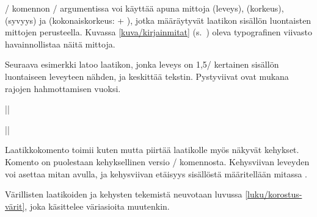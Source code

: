 \begin{koodilohkosis}
\end{koodilohkosis}

\begin{tulossis}
\end{tulossis}

\noindent
{}\-/ komennon \-/ argumentissa voi käyttää
apuna mittoja  (leveys),  (korkeus),
 (syvyys) ja  (kokonaiskorkeus:
 + ), jotka määräytyvät laatikon sisällön
luontaisten mittojen perusteella. Kuvassa \ref{kuva/kirjainmitat}
(s.~\pageref{kuva/kirjainmitat}) oleva typografinen viivasto
havainnollistaa näitä mittoja.

Seuraava esimerkki latoo laatikon, jonka leveys on 1,5\-/ kertainen
sisällön luontaiseen leveyteen nähden, ja keskittää tekstin. Pystyviivat
ovat mukana rajojen hahmottamisen vuoksi.

\begin{koodilohkosis}
||
\end{koodilohkosis}

\begin{tulossis}
  ||
\end{tulossis}

\noindent
Laatikkokomento  toimii kuten  mutta piirtää
laatikolle myös näkyvät kehykset. Komento  on
puolestaan kehyksellinen versio \-/ komennosta.
Kehysviivan leveyden voi asettaa mitan  avulla, ja
kehysviivan etäisyys sisällöstä määritellään mitassa .

\begin{koodilohkosis}
\setlength{\fboxsep}{3bp}
\setlength{\fboxrule}{.5bp}
\end{koodilohkosis}

\begin{tulossis}
  \setlength{\fboxsep}{3bp}
  \setlength{\fboxrule}{.5bp}
\end{tulossis}

\noindent
Värillisten laatikoiden ja kehysten tekemistä neuvotaan luvussa
\ref{luku/korostus-värit}, joka käsittelee väriasioita muutenkin.

